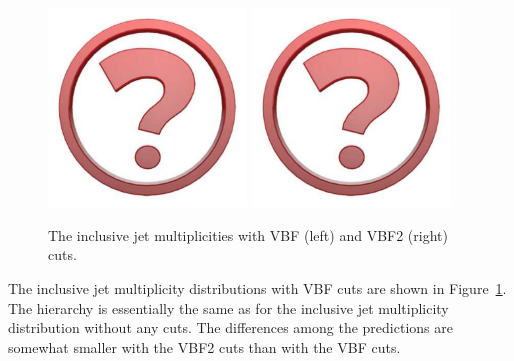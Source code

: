 \begin{figure}[t!]
  \centering
  \includegraphics[width=0.47\textwidth]{Micon.pdf}
  \hfill
  \includegraphics[width=0.47\textwidth]{Micon.pdf}
  \caption{\label{fig:higgscomp:results:inclobs:njets_VBF}
    The inclusive jet multiplicities with VBF (left) and VBF2 (right)
    cuts.  }
\end{figure}

The inclusive jet multiplicity distributions with VBF cuts are shown
in Figure~\ref{fig:higgscomp:results:inclobs:njets_VBF}. The hierarchy
is essentially the same as for the inclusive jet multiplicity
distribution without any cuts. The differences among the predictions
are somewhat smaller with the VBF2 cuts than with the VBF cuts.

